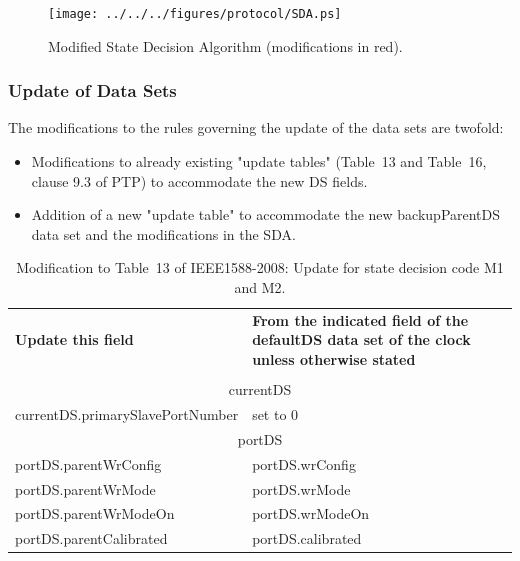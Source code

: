 \documentclass[a4paper, 12pt]{article}
\begin{document}
\begin{figure}[ht!]
  \centering
  \texttt{[image: ../../../figures/protocol/SDA.ps]}
  \caption{Modified State Decision Algorithm (modifications in red).}
  \label{fig:modifiedSDA}
\end{figure}

\newpage

\subsubsection{Update of Data Sets}

The modifications to the rules governing the update of the data sets are twofold:
\begin{itemize}
  \item Modifications to already existing "update tables" (Table~13 and Table~16, clause 9.3 of
	PTP) to accommodate the new DS fields.
  \item Addition of a new "update table" to accommodate the new backupParentDS data set and 
	the modifications in the SDA.
\end{itemize}

\begin{table}[tbp]
\caption{Modification to Table~13 of IEEE1588-2008: Update for state decision code M1 and M2.}
\centering
\begin{tabular}{| p{7.5cm} | p{7.5cm}|}           \hline
\textbf{Update this field}  		&  
\textbf{From the indicated field of the defaultDS data set of the clock unless otherwise stated} \\ 
					&  						\\ \hline
\multicolumn{2}{|c|}{currentDS}								\\ \hline
currentDS.primarySlavePortNumber   	& set to 0					\\ \hline
\multicolumn{2}{|c|}{portDS}	   	 						\\ \hline
portDS.parentWrConfig   		& portDS.wrConfig				\\ \hline
portDS.parentWrMode   			& portDS.wrMode					\\ \hline
portDS.parentWrModeOn   		& portDS.wrModeOn				\\ \hline
portDS.parentCalibrated		   	& portDS.calibrated				\\ \hline

\end{tabular}
\label{tab:modifiedM1M2}
\end{table}
\end{document}
